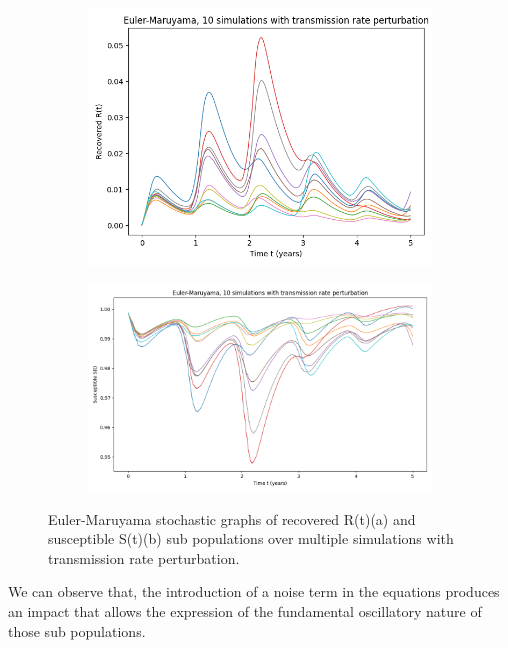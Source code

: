 \begin{figure}[h!]
    \centering
    \begin{subfigure}{0.4\textwidth}
        \includegraphics[width=\linewidth]{IMG/transmission_aphabig_R(t).png}
        \caption{}
    \end{subfigure}
    \begin{subfigure}{0.5\textwidth}
        \includegraphics[width=\linewidth]{IMG/transmission_aphabig_S(t).png}
        \caption{}
    \end{subfigure}
    \caption{Euler-Maruyama stochastic graphs of recovered R(t)(a) and susceptible S(t)(b) sub populations over multiple simulations with transmission rate perturbation.}
    \label{transmission4}
\end{figure}

We can observe that, the introduction of a noise term in the equations produces an impact that allows the expression of the fundamental oscillatory nature of those sub populations.
\newpage